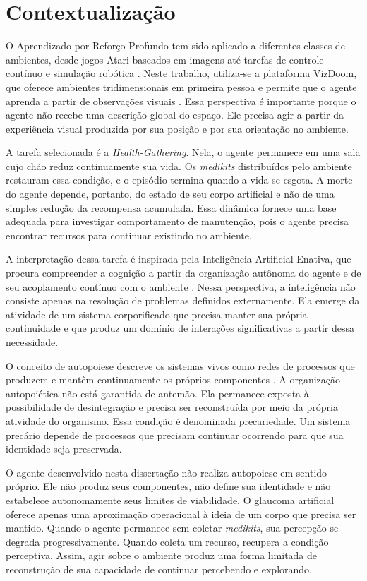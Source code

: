 \section{Contextualização}

O Aprendizado por Reforço Profundo tem sido aplicado a diferentes classes de ambientes, desde jogos Atari baseados em imagens até tarefas de controle contínuo e simulação robótica \cite{mnih-2013,mnih-2015,ppo,clothppo}. Neste trabalho, utiliza-se a plataforma VizDoom, que oferece ambientes tridimensionais em primeira pessoa e permite que o agente aprenda a partir de observações visuais \cite{vizdoom}. Essa perspectiva é importante porque o agente não recebe uma descrição global do espaço. Ele precisa agir a partir da experiência visual produzida por sua posição e por sua orientação no ambiente.

A tarefa selecionada é a \textit{Health-Gathering}. Nela, o agente permanece em uma sala cujo chão reduz continuamente sua vida. Os \textit{medikits} distribuídos pelo ambiente restauram essa condição, e o episódio termina quando a vida se esgota. A morte do agente depende, portanto, do estado de seu corpo artificial e não de uma simples redução da recompensa acumulada. Essa dinâmica fornece uma base adequada para investigar comportamento de manutenção, pois o agente precisa encontrar recursos para continuar existindo no ambiente.

A interpretação dessa tarefa é inspirada pela Inteligência Artificial Enativa, que procura compreender a cognição a partir da organização autônoma do agente e de seu acoplamento contínuo com o ambiente \cite{FROESE2009}. Nessa perspectiva, a inteligência não consiste apenas na resolução de problemas definidos externamente. Ela emerge da atividade de um sistema corporificado que precisa manter sua própria continuidade e que produz um domínio de interações significativas a partir dessa necessidade.

O conceito de autopoiese descreve os sistemas vivos como redes de processos que produzem e mantêm continuamente os próprios componentes \cite{maturana1980autopoiesis,varela1991intentionality}. A organização autopoiética não está garantida de antemão. Ela permanece exposta à possibilidade de desintegração e precisa ser reconstruída por meio da própria atividade do organismo. Essa condição é denominada precariedade. Um sistema precário depende de processos que precisam continuar ocorrendo para que sua identidade seja preservada.

O agente desenvolvido nesta dissertação não realiza autopoiese em sentido próprio. Ele não produz seus componentes, não define sua identidade e não estabelece autonomamente seus limites de viabilidade. O glaucoma artificial oferece apenas uma aproximação operacional à ideia de um corpo que precisa ser mantido. Quando o agente permanece sem coletar \textit{medikits}, sua percepção se degrada progressivamente. Quando coleta um recurso, recupera a condição perceptiva. Assim, agir sobre o ambiente produz uma forma limitada de reconstrução de sua capacidade de continuar percebendo e explorando.

